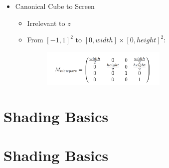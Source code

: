 \documentclass{article}
\begin{document}
\begin{itemize}
\begin{itemize}
\begin{figure}[H]
\end{figure}
\end{itemize}

\item Canonical Cube to Screen
\begin{itemize}
    \item Irrelevant to $z$
    \item From $[-1,1]^2$ to $[0,width]\times[0,height]^2$:
    \begin{figure}[H]
    \centering
    \includegraphics[width=0.6\textwidth]{imgs/viewport.jpeg}
\end{figure}
\end{itemize}

\end{itemize}


\section{Shading Basics}
\section{Shading Basics}
\end{document}
